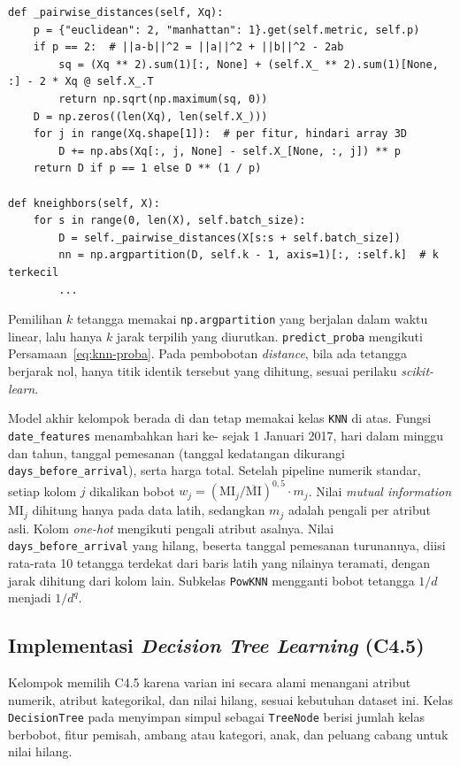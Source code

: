 \begin{lstlisting}[emph={_pairwise_distances,kneighbors},caption={Perhitungan jarak dan pencarian tetangga (\texttt{src/knn.py})},label={lst:knn}]
def _pairwise_distances(self, Xq):
    p = {"euclidean": 2, "manhattan": 1}.get(self.metric, self.p)
    if p == 2:  # ||a-b||^2 = ||a||^2 + ||b||^2 - 2ab
        sq = (Xq ** 2).sum(1)[:, None] + (self.X_ ** 2).sum(1)[None, :] - 2 * Xq @ self.X_.T
        return np.sqrt(np.maximum(sq, 0))
    D = np.zeros((len(Xq), len(self.X_)))
    for j in range(Xq.shape[1]):  # per fitur, hindari array 3D
        D += np.abs(Xq[:, j, None] - self.X_[None, :, j]) ** p
    return D if p == 1 else D ** (1 / p)

def kneighbors(self, X):
    for s in range(0, len(X), self.batch_size):
        D = self._pairwise_distances(X[s:s + self.batch_size])
        nn = np.argpartition(D, self.k - 1, axis=1)[:, :self.k]  # k terkecil
        ...
\end{lstlisting}

Pemilihan $k$ tetangga memakai \texttt{np.argpartition} yang berjalan dalam waktu linear, lalu hanya $k$ jarak terpilih yang diurutkan. \texttt{predict\_proba} mengikuti Persamaan~\ref{eq:knn-proba}. Pada pembobotan \textit{distance}, bila ada tetangga berjarak nol, hanya titik identik tersebut yang dihitung, sesuai perilaku \textit{scikit-learn}.

Model akhir kelompok berada di  dan tetap memakai kelas \texttt{KNN} di atas. Fungsi \texttt{date\_features} menambahkan hari ke- sejak 1 Januari 2017, hari dalam minggu dan tahun, tanggal pemesanan (tanggal kedatangan dikurangi \texttt{days\_before\_arrival}), serta harga total. Setelah pipeline numerik standar, setiap kolom $j$ dikalikan bobot $w_j=(\mathrm{MI}_j/\overline{\mathrm{MI}})^{0{,}5}\cdot m_j$. Nilai \textit{mutual information} $\mathrm{MI}_j$ dihitung hanya pada data latih, sedangkan $m_j$ adalah pengali per atribut asli. Kolom \textit{one-hot} mengikuti pengali atribut asalnya. Nilai \texttt{days\_before\_arrival} yang hilang, beserta tanggal pemesanan turunannya, diisi rata-rata 10 tetangga terdekat dari baris latih yang nilainya teramati, dengan jarak dihitung dari kolom lain. Subkelas \texttt{PowKNN} mengganti bobot tetangga $1/d$ menjadi $1/d^{q}$.

\subsection{Implementasi \textit{Decision Tree Learning} (C4.5)}
Kelompok memilih C4.5 karena varian ini secara alami menangani atribut numerik, atribut kategorikal, dan nilai hilang, sesuai kebutuhan dataset ini. Kelas \texttt{DecisionTree} pada  menyimpan simpul sebagai \texttt{TreeNode} berisi jumlah kelas berbobot, fitur pemisah, ambang atau kategori, anak, dan peluang cabang untuk nilai hilang.


